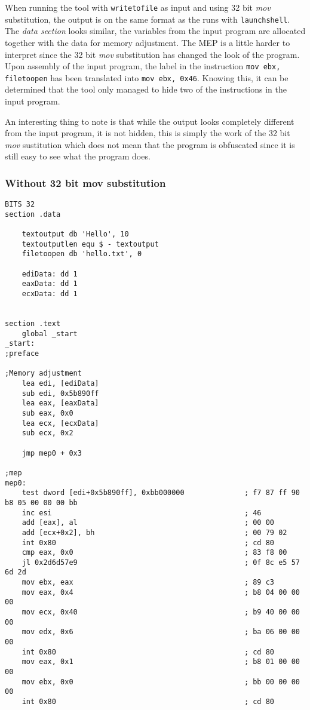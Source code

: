 \documentclass[11pt,twoside]{eitExjobb}
\begin{document}
\noindent When running the tool with \texttt{writetofile} as input and using 32 bit \emph{mov} substitution, the output is on the same format as the runs with \texttt{launchshell}. The \emph{data section} looks similar, the variables from the input program are allocated together with the data for memory adjustment. The MEP is a little harder to interpret since the 32 bit \emph{mov} substitution has changed the look of the program. Upon assembly of the input program, the label in the instruction \texttt{mov ebx, filetoopen} has been translated into \texttt{mov ebx, 0x46}. Knowing this, it can be determined that the tool only managed to hide two of the instructions in the input program. 

An interesting thing to note is that while the output looks completely different from the input program, it is not hidden, this is simply the work of the 32 bit \emph{mov} sustitution which does not mean that the program is obfuscated since it is still easy to see what the program does.

\subsubsection{Without 32 bit mov substitution}
\begin{Verbatim}[fontsize=\tiny]
BITS 32
section .data

    textoutput db 'Hello', 10
    textoutputlen equ $ - textoutput
    filetoopen db 'hello.txt', 0

    ediData: dd 1
    eaxData: dd 1
    ecxData: dd 1


section .text
    global _start
_start:
;preface

;Memory adjustment
    lea edi, [ediData]
    sub edi, 0x5b890ff
    lea eax, [eaxData]
    sub eax, 0x0
    lea ecx, [ecxData]
    sub ecx, 0x2

    jmp mep0 + 0x3

;mep
mep0:
    test dword [edi+0x5b890ff], 0xbb000000              ; f7 87 ff 90 b8 05 00 00 00 bb
    inc esi                                             ; 46
    add [eax], al                                       ; 00 00 
    add [ecx+0x2], bh                                   ; 00 79 02
    int 0x80                                            ; cd 80
    cmp eax, 0x0                                        ; 83 f8 00
    jl 0x2d6d57e9                                       ; 0f 8c e5 57 6d 2d 
    mov ebx, eax                                        ; 89 c3
    mov eax, 0x4                                        ; b8 04 00 00 00
    mov ecx, 0x40                                       ; b9 40 00 00 00 
    mov edx, 0x6                                        ; ba 06 00 00 00
    int 0x80                                            ; cd 80
    mov eax, 0x1                                        ; b8 01 00 00 00
    mov ebx, 0x0                                        ; bb 00 00 00 00
    int 0x80                                            ; cd 80
\end{Verbatim}
\end{document}
